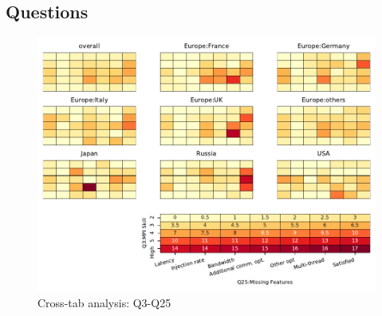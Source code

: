 
\subsection{Questions}


\begin{figure}
\begin{center}
\includegraphics[width=12cm]{../pdfs/Q3-Q25.pdf}
\caption{Cross-tab analysis: Q3-Q25}
\label{fig:Q3-Q25}
\end{center}
\end{figure}
